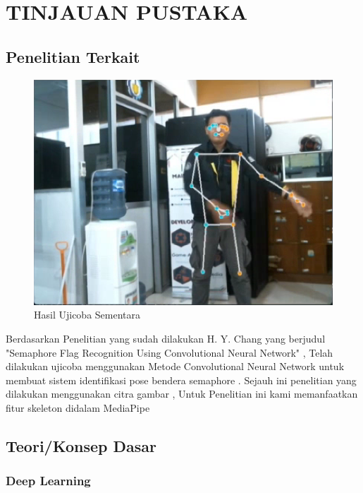 \section{TINJAUAN PUSTAKA}

\subsection{Penelitian Terkait}
\begin{figure} [ht] \centering
    \includegraphics[scale=0.7]{gambar/contoh.png}
    \caption{Hasil Ujicoba Sementara}
    \label{fig:Ujicoba Sementara}
  \end{figure}
Berdasarkan Penelitian yang sudah dilakukan H. Y. Chang yang berjudul "Semaphore Flag Recognition Using Convolutional Neural Network" , Telah dilakukan ujicoba menggunakan Metode Convolutional Neural Network untuk membuat sistem identifikasi pose bendera semaphore . Sejauh ini penelitian yang dilakukan menggunakan citra gambar , Untuk Penelitian ini kami memanfaatkan fitur skeleton didalam MediaPipe 

\subsection{Teori/Konsep Dasar}

\subsubsection{Deep Learning}

